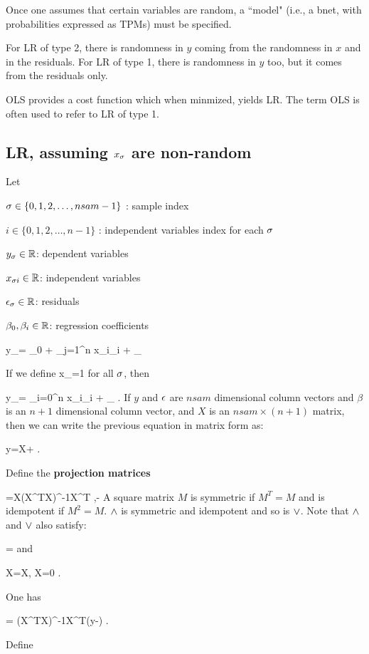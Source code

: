 Once one assumes that certain
variables are random, a ``model" (i.e., a bnet,
with probabilities expressed as TPMs)
 must be 
specified.

For LR of type 2,
there is randomness in $y$ 
coming from the randomness in $x$
and in the residuals.
For LR of type 1,
there  is randomness in $y$
too, but
it comes 
from the residuals
only. 

OLS provides a
cost function which
when minmized, yields LR.
The  term OLS
is often used to refer to LR 
of type 1.

\subsection{LR, assuming
$x_\sigma$ are non-random}

Let

$\sigma\in\{0, 1, 2, \ldots, nsam-1\}$ : sample index

$i\in\{0, 1, 2, \ldots, n-1\}$ : independent variables index
for each $\sigma$

$y_\sigma\in { \mathbb{R}}$: dependent variables

$x_{\sigma i}\in { \mathbb{R}}$: independent variables

$\epsilon_\sigma\in { \mathbb{R}}$: residuals

$\beta_0, \beta_i\in { \mathbb{R}}$: 
regression coefficients


\beq
y_\s= \beta_0 +
\sum_{j=1}^{n} x_{\s i}\beta_i + \eps_\s
\eeq

If we define
\beq
x_{}=1
\;
\eeq
for all $\sigma$, then

\beq
y_\s=
\sum_{i=0}^{n} x_{\s i}\beta_i + \eps_\s
\;.
\eeq
If $y$ and $\epsilon$ are $nsam$ dimensional
 column vectors and $\beta$
is an $n+1$ dimensional column vector,
and $X$ is an $nsam\times (n+1)$ matrix, 
then we can write the previous equation in matrix
form as:


\beq
y=X\beta+\eps
\;.
\eeq

Define the {\bf projection matrices}

\beq
\A=X(X^TX)^{-1}X^T
\;,\;\;-\A
\eeq
A square matrix $M$ 
is symmetric if $M^T=M$
and is idempotent if $M^2=M$.
$\wedge$ is symmetric
and idempotent 
and so is $\vee$.
Note that $\wedge$ and $\vee$ 
also satisfy:  

\beq
\V\A=\A{}
\eeq
and

\beq
\A X=X\;,\;\; \V X=0
\;.
\eeq

One has

\beq
\beta=
(X^TX)^{-1}X^T(y-\eps)
\;.
\eeq


Define 

